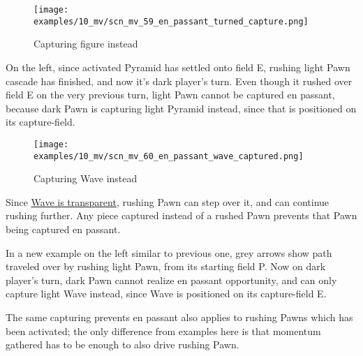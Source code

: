 \clearpage %

\vspace*{-2.1\baselineskip}
\noindent
\begin{wrapfigure}[11]{l}{0.4\textwidth}
\centering
\texttt{[image: examples/10\_mv/scn\_mv\_59\_en\_passant\_turned\_capture.png]}
\vspace*{-1.4\baselineskip}
\caption{Capturing figure instead}
\label{fig:scn_mv_59_en_passant_turned_capture}
\end{wrapfigure}
On the left, since activated Pyramid has settled onto field E, rushing light Pawn
cascade has finished, and now it's dark player's turn. \newline
\indent
Even though it rushed over field E on the very previous turn, light Pawn cannot
be captured en passant, because dark Pawn is capturing light Pyramid instead,
since that is positioned on its capture-field.


\vspace*{1.7\baselineskip}
\noindent
\begin{wrapfigure}[13]{l}{0.4\textwidth}
\centering
\texttt{[image: examples/10\_mv/scn\_mv\_60\_en\_passant\_wave\_captured.png]}
\vspace*{-1.4\baselineskip}
\caption{Capturing Wave instead}
\label{fig:scn_mv_60_en_passant_wave_captured}
\end{wrapfigure}
Since \hyperref[fig:scn_mv_07_wave_is_transparent]{Wave is transparent}, rushing
Pawn can step over it, and can continue rushing further. Any piece captured instead
of a rushed Pawn prevents that Pawn being captured en passant.

In a new example on the left similar to previous one, grey arrows show path traveled
over by rushing light Pawn, from its starting field P. Now on dark player's turn,
dark Pawn cannot realize en passant opportunity, and can only capture light Wave
instead, since Wave is positioned on its capture-field E.

The same capturing prevents en passant also applies to rushing Pawns which has
been activated; the only difference from examples here is that momentum gathered
has to be enough to also drive rushing Pawn.

\clearpage %

